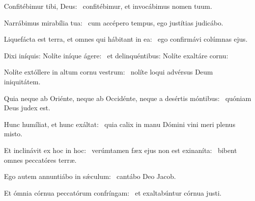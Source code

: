 \item Confitébimur tibi, Deus:~\psstar{} confitébimur, et invocábimus nomen tuum.

\item Narrábimus mirabília tua:~\psstar{} cum accépero tempus, ego justítias judicábo.

\item Liquefácta est terra, et omnes qui hábitant in ea:~\psstar{} ego confirmávi colúmnas ejus.

\item Dixi iníquis: Nolíte iníque ágere:~\psstar{} et delinquéntibus: Nolíte exaltáre cornu:

\item Nolíte extóllere in altum cornu vestrum:~\psstar{} nolíte loqui advérsus Deum iniquitátem.

\item Quia neque ab Oriénte, neque ab Occidénte, neque a desértis móntibus:~\psstar{} quóniam Deus judex est.

\item Hunc humíliat, et hunc exáltat:~\psstar{} quia calix in manu Dómini vini meri plenus misto.

\item Et inclinávit ex hoc in hoc:~\pscross{} verúmtamen fæx ejus non est exinaníta:~\psstar{} bibent omnes peccatóres terræ.

\item Ego autem annuntiábo in sǽculum:~\psstar{} cantábo Deo Jacob.

\item Et ómnia córnua peccatórum confríngam:~\psstar{} et exaltabúntur córnua justi.
